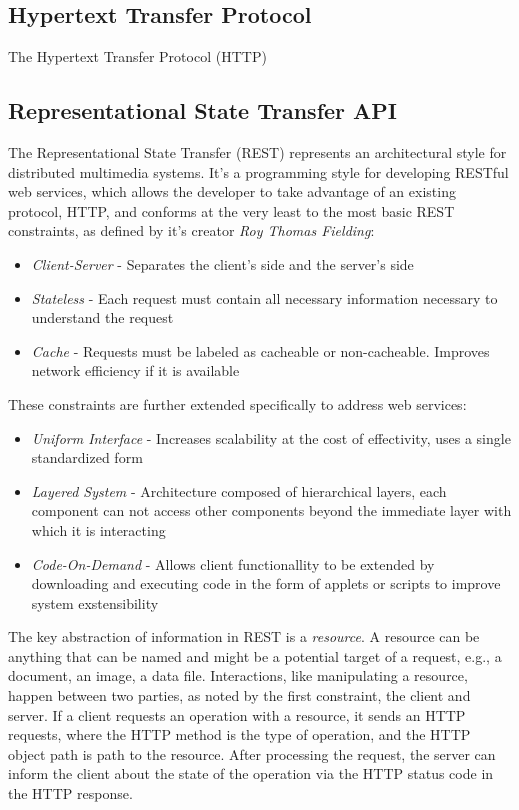 \subsection*{Hypertext Transfer Protocol}
The Hypertext Transfer Protocol (HTTP) 

\cite{MozillaHTTP}

\subsection*{Representational State Transfer API}
The Representational State Transfer (REST) represents an architectural style for distributed multimedia systems. It's a programming style for developing RESTful web services, which allows the developer to take advantage of an existing protocol, HTTP, and conforms at the very least to the most basic REST constraints, as defined by it's creator \textit{Roy Thomas Fielding}:

\begin{itemize}
    \item \textit{Client-Server} - Separates the client's side and the server's side
    \item \textit{Stateless} - Each request must contain all necessary information necessary to understand the request
    \item \textit{Cache} - Requests must be labeled as cacheable or non-cacheable. Improves network efficiency if it is available
\end{itemize}

These constraints are further extended specifically to address web services:
\begin{itemize}
    \item \textit{Uniform Interface} - Increases scalability at the cost of effectivity, uses a single standardized form
    \item \textit{Layered System} - Architecture composed of hierarchical layers, each component can not access other components beyond the immediate layer with which it is interacting
    \item \textit{Code-On-Demand} - Allows client functionallity to be extended by downloading and executing code in the form of applets or scripts to improve system exstensibility
\end{itemize}

The key abstraction of information in REST is a \textit{resource}. A resource can be anything that can be named and might be a potential target of a request, e.g., a document, an image, a data file. Interactions, like manipulating a resource, happen between two parties, as noted by the first constraint, the client and server. If a client requests an operation with a resource, it sends an HTTP requests, where the HTTP method is the type of operation, and the HTTP object path is path to the resource. After processing the request, the server can inform the client about the state of the operation via the HTTP status code in the HTTP response.\cite{RestAPI}

